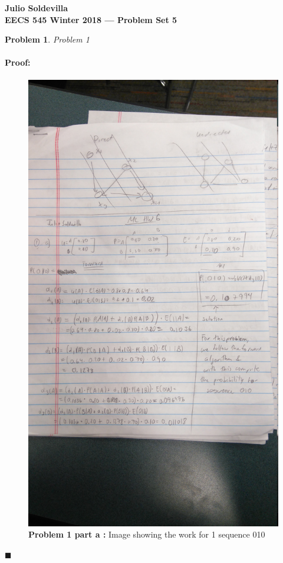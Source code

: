 \documentclass[12pt]{article}
\newenvironment{proof}{\paragraph{Proof: }}{\hfill$\blacksquare$}
\newtheorem{problem}{Problem}%
\begin{document}
\begin{center}
{\bf Julio Soldevilla}
\\
{\bf EECS 545 Winter 2018 --- Problem Set 5 }
\end{center}

\begin{problem}
\normalfont
Problem 1
\end{problem}

\begin{proof}

\begin{figure}[!htbp]
\centering
\includegraphics[width = 13cm]{hw6_1a_1.jpg}
\caption{\textbf{Problem 1 part a :} Image showing the work for 1 sequence 010}
\end{figure}
\newpage


\end{proof}
\end{document}
